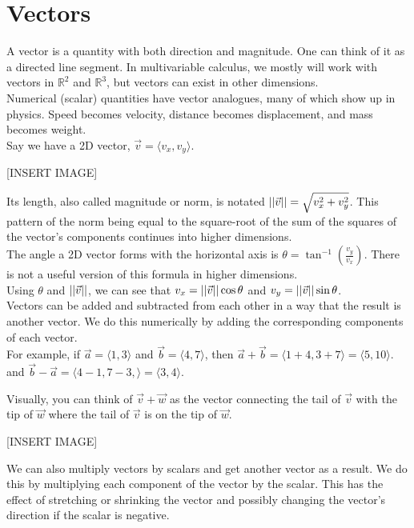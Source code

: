 \section{Vectors}
\noindent
A vector is a quantity with both direction and magnitude. One can think of it as a directed line segment. In multivariable calculus, we mostly will work with vectors in $\mathbb{R}^2$ and $\mathbb{R}^3$, but vectors can exist in other dimensions.\\

\noindent
Numerical (scalar) quantities have vector analogues, many of which show up in physics. Speed becomes velocity, distance becomes displacement, and mass becomes weight.\\

\noindent
Say we have a 2D vector, $\vec{v}=\langle v_x, v_y \rangle$.

[INSERT IMAGE]

\noindent
Its length, also called magnitude or norm, is notated $\left|\left|\vec{v}\right|\right|=\sqrt{v_x^2+v_y^2}$. This pattern of the norm being equal to the square-root of the sum of the squares of the vector's components continues into higher dimensions.\\

\noindent
The angle a 2D vector forms with the horizontal axis is $\theta = \tan^{-1}{\left(\frac{v_y}{v_x}\right)}$. There is not a useful version of this formula in higher dimensions.\\
Using $\theta$ and $\left|\left|\vec{v}\right|\right|$, we can see that $v_x=\left|\left|\vec{v}\right|\right|\cos{\theta}$ and $v_y=\left|\left|\vec{v}\right|\right|\sin{\theta}$.\\

\noindent
Vectors can be added and subtracted from each other in a way that the result is another vector. We do this numerically by adding the corresponding components of each vector.\\
For example, if $\vec{a}=\langle 1,3 \rangle$ and $\vec{b}=\langle 4,7 \rangle$, then $\vec{a}+\vec{b}=\langle 1+4, 3+7 \rangle = \langle 5,10 \rangle$.\\
and $\vec{b}-\vec{a}=\langle 4-1, 7-3, \rangle=\langle 3,4 \rangle$.

\noindent
Visually, you can think of $\vec{v}+\vec{w}$ as the vector connecting the tail of $\vec{v}$ with the tip of $\vec{w}$ where the tail of $\vec{v}$ is on the tip of $\vec{w}$.

[INSERT IMAGE]

\noindent
We can also multiply vectors by scalars and get another vector as a result. We do this by multiplying each component of the vector by the scalar. This has the effect of stretching or shrinking the vector and possibly changing the vector's direction if the scalar is negative.

